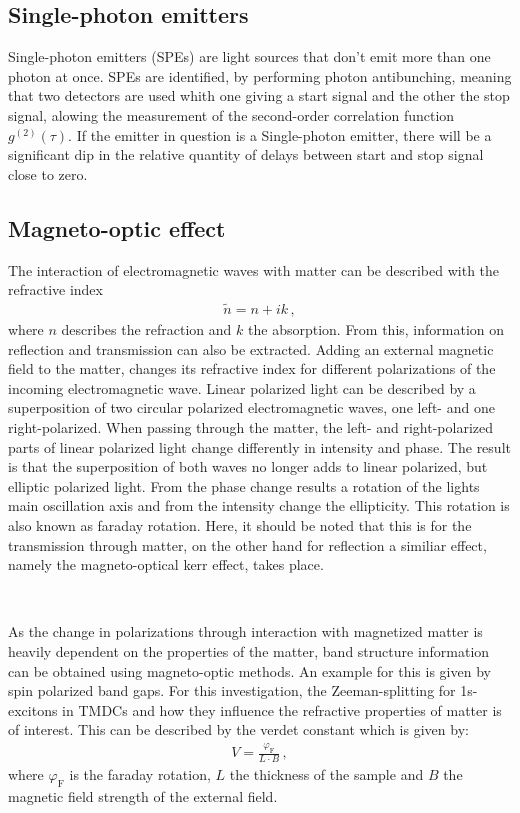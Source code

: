 \subsection{Single-photon emitters}
\label{sec:theory:spe}

Single-photon emitters (SPEs) are light sources that don't emit more than one photon at once.
SPEs are identified, by performing photon antibunching, meaning that two detectors are used whith one giving a start signal and the other the stop signal, alowing the measurement of the second-order correlation function $g^{(2)}(\tau)$.
If the emitter in question is a Single-photon emitter, there will be a significant dip in the relative quantity of delays between start and stop signal close to zero.


\subsection{Magneto-optic effect}

	The interaction of electromagnetic waves with matter can be described with the refractive index
	\begin{align*}
		\tilde{n} = n + ik \,,
	\end{align*}
	where $n$ describes the refraction and $k$ the absorption.
	From this, information on reflection and transmission can also be extracted.
	Adding an external magnetic field to the matter, changes its refractive index for different polarizations of the incoming electromagnetic wave.
	Linear polarized light can be described by a superposition of two circular polarized electromagnetic waves, one left- and one right-polarized.
	When passing through the matter, the left- and right-polarized parts of linear polarized light change differently in intensity and phase.
	The result is that the superposition of both waves no longer adds to linear polarized, but elliptic polarized light.
	From the phase change results a rotation of the lights main oscillation axis and from the intensity change the ellipticity.
	This rotation is also known as faraday rotation.
	Here, it should be noted that this is for the transmission through matter, on the other hand for reflection a similiar effect, namely the magneto-optical kerr effect, takes place.

	\

	As the change in polarizations through interaction with magnetized matter is heavily dependent on the properties of the matter, band structure information can be obtained using magneto-optic methods.
	An example for this is given by spin polarized band gaps.
	For this investigation, the Zeeman-splitting for 1s-excitons in TMDCs and how they influence the refractive properties of matter is of interest.
	This can be described by the verdet constant which is given by:
	\begin{align*}
		V = \frac{\varphi_\text{F}}{L\cdot B} \,,
	\end{align*}
	where $\varphi_\text{F}$ is the faraday rotation, $L$ the thickness of the sample and $B$ the magnetic field strength of the external field.

